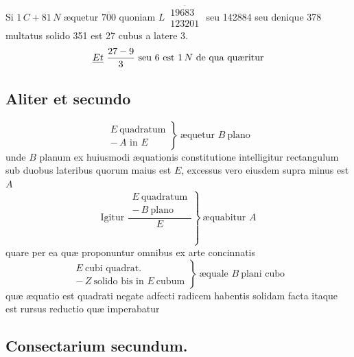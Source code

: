\documentclass[11pt,a4paper]{article}
\begin{document}
Si $1\,C + 81\,N$ æquetur $\overline{700}$ quoniam $L\,\overline{\begin{array}{l} 19683 \\ 123201 \end{array}}$ seu 142884 seu denique 378 multatus solido 351 est 27 cubus a latere 3.
\[ \struck{Et}\ \dfrac{27 - 9}{3} \text{ seu } 6 \text{ est } 1\,N \text{ de qua quæritur} \]

\subsection*{Aliter et secundo}

\[ \left.\begin{array}{l} E\ \text{quadratum} \\ -\,A \text{ in } E \end{array}\right\}\ \text{æquetur } B\ \text{plano} \]
unde $B$ planum ex huiusmodi æquationis constitutione intelligitur rectangulum sub duobus lateribus quorum maius est $E$, excessus vero eiusdem supra minus est $A$
\[ \text{Igitur } \left.\dfrac{\begin{array}{l} E\ \text{quadratum} \\ -\,B\ \text{plano} \end{array}}{E}\right\}\ \text{æquabitur } A \]
quare per ea quæ proponuntur omnibus ex arte concinnatis
\[ \left.\begin{array}{l} E\ \text{cubi quadrat.} \\ -\,Z\ \text{solido bis in } E\ \text{cubum} \end{array}\right\}\ \text{æquale } B\ \text{plani cubo} \]
quæ æquatio est quadrati negate adfecti radicem habentis solidam facta itaque est rursus reductio quæ imperabatur

\subsection*{Consectarium secundum.}
\end{document}
